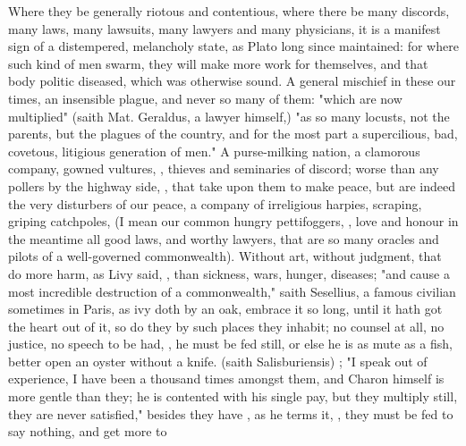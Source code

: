 Where they be generally riotous and contentious, where there be many discords,
many laws, many lawsuits, many lawyers and many physicians, it is a manifest
sign of a distempered, melancholy state, as Plato long
since maintained: for where such kind of men swarm, they will make more work
for themselves, and that body politic diseased, which was otherwise sound. A
general mischief in these our times, an insensible plague, and never so many of
them: "which are now multiplied" (saith Mat. Geraldus, a
lawyer himself,) "as so many locusts, not the parents, but the plagues of the
country, and for the most part a supercilious, bad, covetous, litigious
generation of men."  \etc{} A
purse-milking nation, a clamorous company, gowned vultures,
, thieves and
seminaries of discord; worse than any pollers by the highway side, , \etc{} that take upon
them to make peace, but are indeed the very disturbers of our peace, a company
of irreligious harpies, scraping, griping catchpoles, (I mean our common hungry
pettifoggers, , love and honour in the
meantime all good laws, and worthy lawyers, that are so many
oracles and pilots of a well-governed commonwealth).
Without art, without judgment, that do more harm, as Livy
said, , than sickness, wars, hunger,
diseases; "and cause a most incredible destruction of a commonwealth," saith
Sesellius, a famous civilian sometimes in Paris, as ivy
doth by an oak, embrace it so long, until it hath got the heart out of it, so
do they by such places they inhabit; no counsel at all, no justice, no speech
to be had, , he must be fed still, or else he is as
mute as a fish, better open an oyster without a knife. 
(saith Salisburiensis) ; "I
speak out of experience, I have been a thousand times amongst them, and Charon
himself is more gentle than they; he is contented with his
single pay, but they multiply still, they are never satisfied," besides they
have , as he terms it, , they must be fed to say nothing, and get more to
